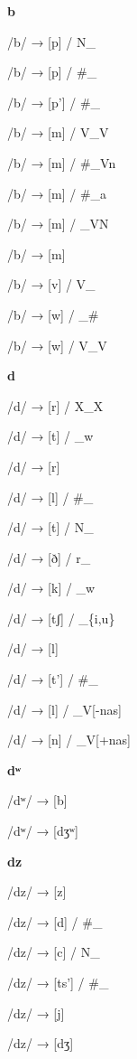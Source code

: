 \begin{center}\textbf{b}\end{center}
\begin{multicols}{4}
\noindent /b/ → [p] / N\_

\noindent /b/ → [p] / \#\_

\noindent /b/ → [p'] / \#\_

\noindent /b/ → [m] / V\_V

\noindent /b/ → [m] / \#\_Vn

\noindent /b/ → [m] / \#\_a

\noindent /b/ → [m] / \_VN

\noindent /b/ → [m]

\noindent /b/ → [v] / V\_

\noindent /b/ → [w] / \_\#

\noindent /b/ → [w] / V\_V
\end{multicols}

\begin{center}\textbf{d}\end{center}
\begin{multicols}{4}
\noindent /d/ → [r] / X\_X

\noindent /d/ → [t] / \_w

\noindent /d/ → [r]

\noindent /d/ → [l] / \#\_

\noindent /d/ → [t] / N\_

\noindent /d/ → [ð] / r\_

\noindent /d/ → [k] / \_w

\noindent /d/ → [tʃ] / \_\{i,u\}

\noindent /d/ → [l]

\noindent /d/ → [t'] / \#\_

\noindent /d/ → [l] / \_V[-nas]

\noindent /d/ → [n] / \_V[+nas]

\end{multicols}


\begin{center}\textbf{dʷ}\end{center}
\begin{multicols}{4}
\noindent /dʷ/ → [b]

\noindent /dʷ/ → [dʒʷ]
\end{multicols}


\begin{center}\textbf{dz}\end{center}
\begin{multicols}{4}
\noindent /dz/ → [z]

\noindent /dz/ → [d] / \#\_

\noindent /dz/ → [c] / N\_

\noindent /dz/ → [ts'] / \#\_

\noindent /dz/ → [j]

\noindent /dz/ → [dʒ]

\end{multicols}


